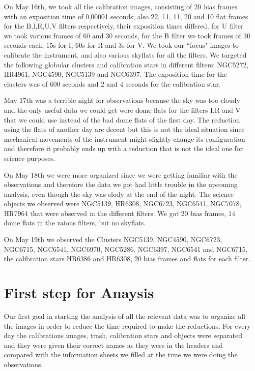 On May 16th, we took all the calibration images, consisting of 20 bias frames with an exposition time of 0,00001 seconds; also 22, 11, 11, 20 and 10 flat frames for the B,I,R,U,V filters respectively, their exposition times differed, for  U filter we took various frames of 60 and 30 seconds, for the B filter we took frames of 30 seconds each, 15s for I, 60s for R and 3s for V. We took our ``focus" images to calibrate the instrument, and also various skyflats for all the filters. We targeted the following globular clusters and calibration stars in different filters: NGC5272, HR4961, NGC4590, NGC5139 and NGC6397. The exposition time for the clusters was of 600 seconds and 2 and 4 seconds for the calibration star. 

May 17th was a terrible night for observations because the sky was too cloudy and the only useful data we could get were dome flats for the filters I,R and V that we could use instead of the bad dome flats of the first day. The reduction using the flats of another day are decent but this is not the ideal situation since mechanical movements of the instrument might slightly change its configuration and therefore it probably ends up with a reduction that is not the ideal one for science purposes.  

On May 18th we were more organized since we were getting familiar with the observations and therefore the data we got had little trouble in the upcoming analysis, even though the sky was clody at the end of the night. The science objects we observed were NGC5139, HR6308, NGC6723, NGC6541, NGC7078, HR7964 that were observed in the different filters. We got 20 bias frames, 14 dome flats in the vaious filters, but no skyflats. 

On May 19th we observed the Clusters NGC5139, NGC4590, NGC6723, NGC6715, NGC6541, NGC6970, NGC5286,    NGC6397, NGC6541 and NGC6715, the calibration stars HR6386 and HR6308, 20 bias frames and flats for each filter.

\section{First step for Anaysis}

Our first goal in starting the analysis of all the relevant data was to organize all the images in order to reduce the time required to make the reductions. For every day the calibrations images, trash, calibration stars and objects were separated and they were given their correct names as they were in the headers and compared with the information sheets we filled at the time we were doing the observations.

